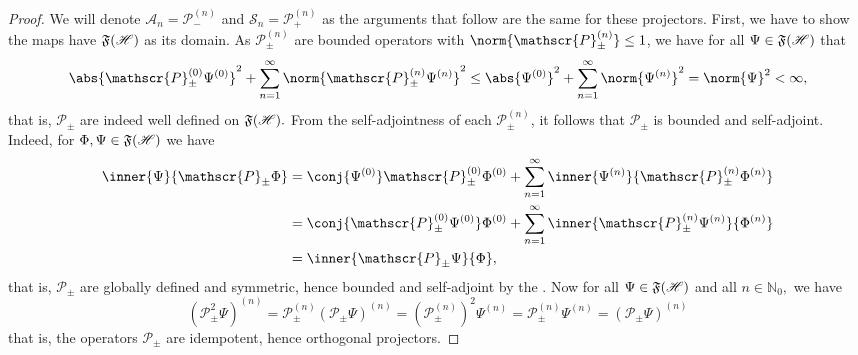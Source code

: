 \begin{proof}
    We will denote \(\mathscr{A}_n = \mathscr{P}^{(n)}_{-}\) and \(\mathscr{S}_n = \mathscr{P}_{+}^{(n)}\) as the arguments that follow are the same for these projectors. 
    First, we have to show the maps have \(\mathfrak{F}(\mathscr{H})\) as its domain. As \(\mathscr{P}_\pm^{(n)}\) are bounded operators with \(\norm{\mathscr{P}^{(n)}_{\pm}} \leq 1\), we have for all \(\Psi \in \mathfrak{F}(\mathscr{H})\) that
    \begin{equation*}
        \abs{\mathscr{P}^{(0)}_{\pm} \Psi^{(0)}}^2 + \sum_{n = 1}^\infty{\norm{\mathscr{P}^{(n)}_{\pm}\Psi^{(n)}}^2} \leq \abs{\Psi^{(0)}}^2 + \sum_{n = 1}^\infty{\norm{\Psi^{(n)}}^2} = \norm{\Psi}^2 < \infty,
    \end{equation*}
    that is, \(\mathscr{P}_\pm\) are indeed well defined on \(\mathfrak{F}(\mathscr{H}).\) From the self-adjointness of each \(\mathscr{P}^{(n)}_{\pm}\), it follows that \(\mathscr{P}_\pm\) is bounded and self-adjoint. Indeed, for \(\Phi, \Psi \in \mathfrak{F}(\mathscr{H})\) we have
    \begin{align*}
        \inner{\Psi}{\mathscr{P}_\pm\Phi} &= \conj{\Psi^{(0)}} \mathscr{P}^{(0)}_\pm \Phi^{(0)} + \sum_{n = 1}^\infty{\inner{\Psi^{(n)}}{\mathscr{P}^{(n)}_\pm\Phi^{(n)}}}\\
                                          &= \conj{\mathscr{P}^{(0)}_\pm\Psi^{(0)}}  \Phi^{(0)} + \sum_{n = 1}^\infty{\inner{\mathscr{P}^{(n)}_\pm\Psi^{(n)}}{\Phi^{(n)}}}\\
                                          &= \inner{\mathscr{P}_{\pm} \Psi}{\Phi},
    \end{align*}
    that is, \(\mathscr{P}_{\pm}\) are globally defined and symmetric, hence bounded and self-adjoint by the . Now for all \(\Psi \in \mathfrak{F}(\mathscr{H})\) and all \(n \in \mathbb{N}_0,\) we have
    \begin{equation*}
        \left(\mathscr{P}_\pm^2 \Psi\right)^{(n)} = \mathscr{P}^{(n)}_{\pm} \left(\mathscr{P}_\pm \Psi\right)^{(n)} = \left(\mathscr{P}^{(n)}_{\pm}\right)^2 \Psi^{(n)} = \mathscr{P}^{(n)}_{\pm} \Psi^{(n)} = \left(\mathscr{P}_{\pm} \Psi\right)^{(n)}
    \end{equation*}
    that is, the operators \(\mathscr{P}_{\pm}\) are idempotent, hence orthogonal projectors.
\end{proof}

